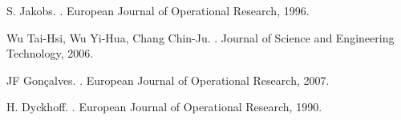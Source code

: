 \begin{thebibliography}{11}
		S. Jakobs.
		.
		\newblock European Journal of Operational Research, 1996. 
	
		Wu Tai-Hsi, Wu Yi-Hua, Chang Chin-Ju.
		.
		\newblock Journal of Science and Engineering Technology, 2006.

		JF Gonçalves.
		.
		\newblock European Journal of Operational Research, 2007.
	
		H. Dyckhoff.
		.
		\newblock European Journal of Operational Research, 1990.	
\end{thebibliography}
